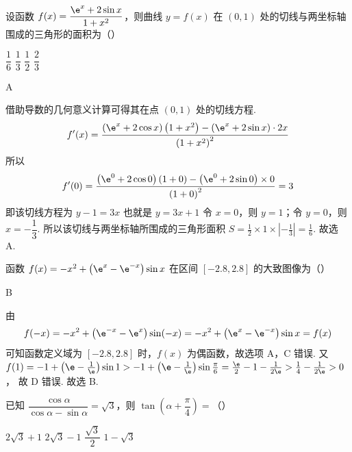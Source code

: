 \begin{problem}
设函数 \( f(x)=\dfrac{\e^x+2\sin x}{1+x^2} \)，则曲线 \( y=f(x) \) 在 \( (0,1) \) 处的切线与两坐标轴围成的三角形的面积为（\quad）

\choices
    {\( \dfrac{1}{6} \)}
    {\( \dfrac{1}{3} \)}
    {\( \dfrac{1}{2} \)}
    {\( \dfrac{2}{3} \)}
\end{problem}

\begin{answer}
A
\end{answer}

\begin{solution}
借助导数的几何意义计算可得其在点 \( (0,1) \) 处的切线方程.
\[
f'(x)=\frac{\left( \e^x+2\cos x \right)\left( 1+x^2 \right)-\left( \e^x+2\sin x \right)\cdot 2x}{\left( 1+x^2 \right)^2}
\]
所以
\[
f'(0)=\frac{\left( \e^0+2\cos 0 \right)\left( 1+0 \right)-\left( \e^0+2\sin 0 \right)\times 0}{\left( 1+0 \right)^2}=3
\]
即该切线方程为
\(
y-1=3x
\)
也就是
\(
y=3x+1
\)
令 \( x=0 \)，则 \( y=1 \)；令 \( y=0 \)，则 \( x=-\dfrac{1}{3} \).
所以该切线与两坐标轴所围成的三角形面积
\(S=\frac{1}{2}\times 1\times \left| -\frac{1}{3} \right|=\frac{1}{6}\).
故选 A.
\end{solution}

\begin{problem}
函数 \( f(x)=-x^2+\left( \e^x-\e^{-x} \right)\sin x \) 在区间 \( [-2.8,2.8] \) 的大致图像为（\quad）

    {}
    {}
    {}
\end{problem}

\begin{answer}
B
\end{answer}

\begin{solution}
由
\[
f(-x)=-x^2+\left( \e^{-x}-\e^x \right)\sin(-x)=-x^2+\left( \e^x-\e^{-x} \right)\sin x=f(x)
\]
可知函数定义域为 \( [-2.8,2.8] \) 时，\( f(x) \) 为偶函数，故选项 A，C 错误.
又
\(f(1)=-1+\left( \e-\frac{1}{\e} \right)\sin 1>-1+\left( \e-\frac{1}{\e} \right)\sin \frac{\pi}{6}=\frac{\e}{2}-1-\frac{1}{2\e}>\frac{1}{4}-\frac{1}{2\e}>0\)，
故 D 错误.
故选 B.
\end{solution}

\begin{problem}
已知 \( \dfrac{\cos \alpha}{\cos \alpha-\sin \alpha}=\sqrt{3} \)，则 \( \tan \left( \alpha+\dfrac{\pi}{4} \right)= \)（\quad）

\choices
    {\( 2\sqrt{3}+1 \)}
    {\( 2\sqrt{3}-1 \)}
    {\( \dfrac{\sqrt{3}}{2} \)}
    {\( 1-\sqrt{3} \)}
\end{problem}

